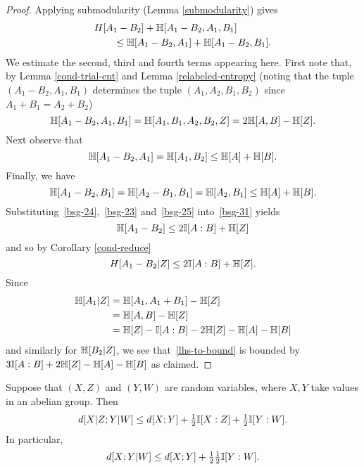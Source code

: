 \begin{proof}
Applying submodularity (Lemma \ref{submodularity}) gives
\begin{equation}\label{bsg-31} \begin{split}
&H[A_1 - B_2] + \mathbb{H}[A_1 - B_2, A_1, B_1] \\
&\qquad \leq \mathbb{H}[A_1 - B_2, A_1] + \mathbb{H}[A_1 - B_2,B_1].
\end{split}\end{equation}
We estimate the second, third and fourth terms appearing here.
First note that, by Lemma \ref{cond-trial-ent} and Lemma \ref{relabeled-entropy} (noting that the tuple $(A_1 - B_2, A_1, B_1)$  determines the tuple $(A_1, A_2, B_1, B_2)$ since $A_1+B_1=A_2+B_2$)
\begin{equation}\label{bsg-24} \mathbb{H}[A_1 - B_2, A_1, B_1] = \mathbb{H}[A_1, B_1, A_2, B_2,Z] = 2\mathbb{H}[A,B] - \mathbb{H}[Z].\end{equation}
Next observe that
\begin{equation}\label{bsg-23} \mathbb{H}[A_1 - B_2, A_1] = \mathbb{H}[A_1, B_2] \leq \mathbb{H}[A] + \mathbb{H}[B].
\end{equation}
Finally, we have
\begin{equation}\label{bsg-25} \mathbb{H}[A_1 - B_2, B_1] = \mathbb{H}[A_2 - B_1, B_1] = \mathbb{H}[A_2, B_1] \leq \mathbb{H}[A] + \mathbb{H}[B].\end{equation}
Substituting~\eqref{bsg-24},~\eqref{bsg-23} and~\eqref{bsg-25} into~\eqref{bsg-31} yields
\[ \mathbb{H}[A_1 - B_2] \leq 2 \mathbb{I}[A:B] + \mathbb{H}[Z]\] and so by Corollary \ref{cond-reduce}
\[H[A_1 - B_2 | Z]  \leq 2 \mathbb{I}[A:B] + \mathbb{H}[Z].\]
Since
\begin{align*} \mathbb{H}[A_1 | Z] & = \mathbb{H}[A_1, A_1 + B_1] - \mathbb{H}[Z] \\ & = \mathbb{H}[A,B] - \mathbb{H}[Z] \\ & = \mathbb{H}[Z] -  \mathbb{I}[A:B] - 2 \mathbb{H}[Z]- \mathbb{H}[A]-\mathbb{H}[B]\end{align*}
and similarly for $\mathbb{H}[B_2 | Z]$, we see that~\eqref{lhs-to-bound} is bounded by
$3 \mathbb{I}[A:B] + 2\mathbb{H}[Z]-\mathbb{H}[A]-\mathbb{H}[B]$ as claimed.
\end{proof}


\begin{lemma}\label{cond-dist-fact}
  \leanok
  Suppose that $(X, Z)$ and $(Y, W)$ are random variables, where $X, Y$ take values in an abelian group. Then
  \[    d[X  | Z;Y | W] \leq d[X; Y] + \tfrac{1}{2}  \mathbb{I}[X : Z] + \tfrac{1}{2}  \mathbb{I}[Y : W].\]
  In particular,
  \[    d[X ;Y | W] \leq d[X; Y] + \tfrac{1}{2}   \tfrac{1}{2}  \mathbb{I}[Y : W].\]
\end{lemma}

